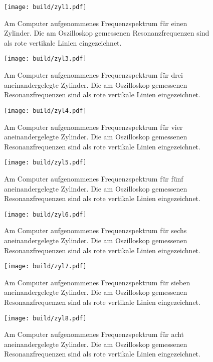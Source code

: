 \newpage
{}
\label{sec:Anhang}

\begin{figure}
  \centering
  \texttt{[image: build/zyl1.pdf]}
  \caption{Am Computer aufgenommenes Frequenzspektrum für einen
  Zylinder. Die am Oszilloskop gemessenen Resonanzfrequenzen sind als rote vertikale
  Linien eingezeichnet.}
  \label{fig:zyl1}
\end{figure}

\begin{figure}
  \centering
  \texttt{[image: build/zyl3.pdf]}
  \caption{Am Computer aufgenommenes Frequenzspektrum für drei aneinandergelegte
  Zylinder. Die am Oszilloskop gemessenen Resonanzfrequenzen sind als rote vertikale
  Linien eingezeichnet.}
  \label{fig:zyl3}
\end{figure}

\begin{figure}
  \centering
  \texttt{[image: build/zyl4.pdf]}
  \caption{Am Computer aufgenommenes Frequenzspektrum für vier aneinandergelegte
  Zylinder. Die am Oszilloskop gemessenen Resonanzfrequenzen sind als rote vertikale
  Linien eingezeichnet.}
  \label{fig:zyl4}
\end{figure}

\begin{figure}
  \centering
  \texttt{[image: build/zyl5.pdf]}
  \caption{Am Computer aufgenommenes Frequenzspektrum für fünf aneinandergelegte
  Zylinder. Die am Oszilloskop gemessenen Resonanzfrequenzen sind als rote vertikale
  Linien eingezeichnet.}
  \label{fig:zyl5}
\end{figure}

\begin{figure}
  \centering
  \texttt{[image: build/zyl6.pdf]}
  \caption{Am Computer aufgenommenes Frequenzspektrum für sechs aneinandergelegte
  Zylinder. Die am Oszilloskop gemessenen Resonanzfrequenzen sind als rote vertikale
  Linien eingezeichnet.}
  \label{fig:zyl6}
\end{figure}

\begin{figure}
  \centering
  \texttt{[image: build/zyl7.pdf]}
  \caption{Am Computer aufgenommenes Frequenzspektrum für sieben aneinandergelegte
  Zylinder. Die am Oszilloskop gemessenen Resonanzfrequenzen sind als rote vertikale
  Linien eingezeichnet.}
  \label{fig:zyl7}
\end{figure}

\begin{figure}
  \centering
  \texttt{[image: build/zyl8.pdf]}
  \caption{Am Computer aufgenommenes Frequenzspektrum für acht aneinandergelegte
  Zylinder. Die am Oszilloskop gemessenen Resonanzfrequenzen sind als rote vertikale
  Linien eingezeichnet.}
  \label{fig:zyl8}
\end{figure}

